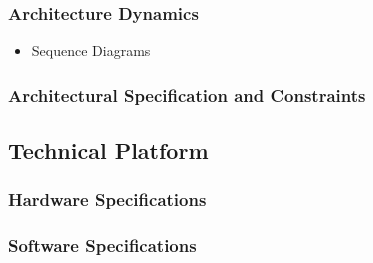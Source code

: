 	\subsubsection{Architecture Dynamics}
		\begin{itemize}
			\item Sequence Diagrams
		\end{itemize}
	\subsubsection{Architectural Specification and Constraints}
\subsection{Technical Platform}
	\subsubsection{Hardware Specifications}
	\subsubsection{Software Specifications}